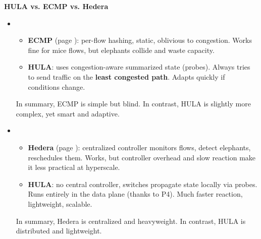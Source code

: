 \highspace
\begin{flushleft}
    \textcolor{Green3}{ \textbf{HULA vs. ECMP vs. Hedera}}
\end{flushleft}
\begin{itemize}
    \item {}
    \begin{itemize}
        \item \textbf{ECMP} (page \pageref{subsection: Equal Cost Multi Path (ECMP)}): per-flow hashing, static, oblivious to congestion. Works fine for mice flows, but elephants collide and waste capacity.
        \item \textbf{HULA}: uses congestion-aware summarized state (probes). Always tries to send traffic on the \textbf{least congested path}. Adapts quickly if conditions change.
    \end{itemize}
    In summary, ECMP is simple but blind. In contrast, HULA is slightly more complex, yet smart and adaptive.
    \item {}
    \begin{itemize}
        \item \textbf{Hedera} (page \pageref{subsection: Hedera - Dynamic Flow Scheduling}): centralized controller monitors flows, detect elephants, reschedules them. Works, but controller overhead and slow reaction make it less practical at hyperscale.
        \item \textbf{HULA}: no central controller, switches propagate state locally via probes. Runs entirely in the data plane (thanks to P4). Much faster reaction, lightweight, scalable.
    \end{itemize}
    In summary, Hedera is centralized and heavyweight. In contrast, HULA is distributed and lightweight.
\end{itemize}

